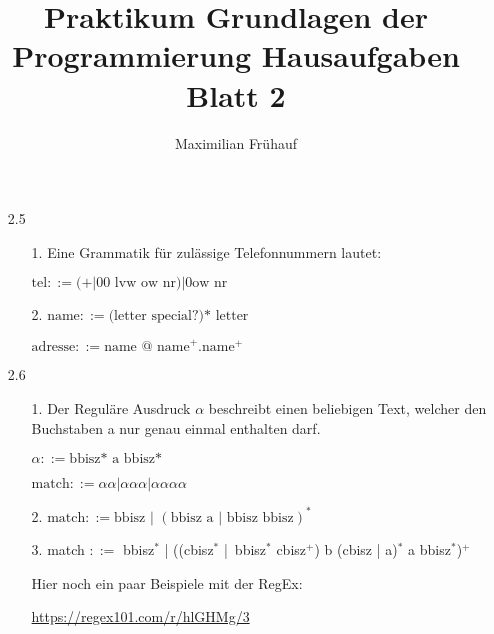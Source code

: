 \documentclass[a4paper, 10pt]{article}
\title{Praktikum Grundlagen der Programmierung Hausaufgaben Blatt 2}
\author{Maximilian Frühauf}
\begin{document}
\maketitle

\begin{enumerate}
	\item[2.5]
	      \begin{enumerate}
		      \item[1.] Eine Grammatik für zulässige Telefonnummern lautet:

		            \( \text{tel} ::= (+ | 00 \text{ lvw ow nr}) | 0 \text{ow nr}\)
		      \item[2.] \( \text{name} ::= \text{(letter special?)* letter } \)

				\( \text{adresse} ::= \text{name @ name}^+ . \text{name}^+ \)
	      \end{enumerate}
	\item[2.6]
	      \begin{enumerate}
		      \item[1.] Der Reguläre Ausdruck \( \alpha \) beschreibt einen beliebigen Text, welcher den Buchstaben
		            a nur genau einmal enthalten darf.

		            \( \alpha ::= \text{bbisz* a bbisz*} \)

		            \( \text{match} ::=  \alpha\alpha | \alpha\alpha\alpha | \alpha\alpha\alpha\alpha \)
		      \item[2.] \( \text{match} ::= \text{bbisz | } (\text{bbisz a | bbisz bbisz})^* \)
		      \item[3.]
		            match \( ::=  \) bbisz\( ^* \) |
		            ((cbisz\( ^* \) | bbisz\( ^* \) cbisz\( ^+ \)) b (cbisz | a)\( ^* \) a bbisz\( ^* \))\( ^+ \)

		            \vspace{10pt}
		            Hier noch ein paar Beispiele mit der RegEx:

		            \url{https://regex101.com/r/hlGHMg/3}
	      \end{enumerate}
\end{enumerate}
\end{document}
